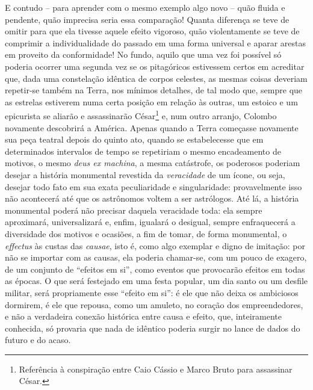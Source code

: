 E contudo -- para aprender com o mesmo exemplo algo novo -- quão fluida e
pendente, quão imprecisa seria essa comparação! Quanta diferença se teve
de omitir para que ela tivesse aquele efeito vigoroso, quão
violentamente se teve de comprimir a individualidade do passado em uma
forma universal e aparar arestas em proveito da conformidade! No fundo,
aquilo que uma vez foi possível só poderia ocorrer uma segunda vez se os
pitagóricos estivessem certos em acreditar que, dada uma constelação
idêntica de corpos celestes, as mesmas coisas deveriam repetir-se também
na Terra, nos mínimos detalhes, de tal modo que, sempre que as estrelas
estiverem numa certa posição em relação às outras, um estoico e um
epicurista se aliarão e assassinarão César\footnote{Referência à conspiração entre
  Caio Cássio e Marco Bruto para assassinar César.} e, num outro arranjo, Colombo
novamente descobrirá a América. Apenas quando a
Terra começasse novamente sua peça teatral depois do quinto ato, quando
se estabelecesse que em determinados intervalos de tempo se repetiriam o
mesmo encadeamento de motivos, o mesmo \emph{deus ex machina}, a mesma
catástrofe, os poderosos poderiam desejar a história monumental
revestida da \emph{veracidade} de um ícone, ou seja, desejar todo fato
em sua exata peculiaridade e singularidade: provavelmente isso não
acontecerá até que os astrônomos voltem a ser astrólogos. Até lá, a
história monumental poderá não precisar daquela veracidade toda: ela
sempre aproximará, universalizará e, enfim, igualará o desigual, sempre
enfraquecerá a diversidade dos motivos e ocasiões, a fim de tomar, de
forma monumental, o \emph{effectus} às custas das \emph{causae}, isto é,
como algo exemplar e digno de imitação: por não se importar com as
causas, ela poderia chamar-se, com um pouco de exagero, de um conjunto
de ``efeitos em si'', como eventos que provocarão efeitos em todas as
épocas. O que será festejado em uma festa popular, um dia santo ou um
desfile militar, será propriamente esse ``efeito em si'': é ele que não
deixa os ambiciosos dormirem, é ele que repousa, como um amuleto, no
coração dos empreendedores, e não a verdadeira conexão histórica entre
causa e efeito, que, inteiramente conhecida, só provaria que nada de
idêntico poderia surgir no lance de dados do futuro e do acaso.

